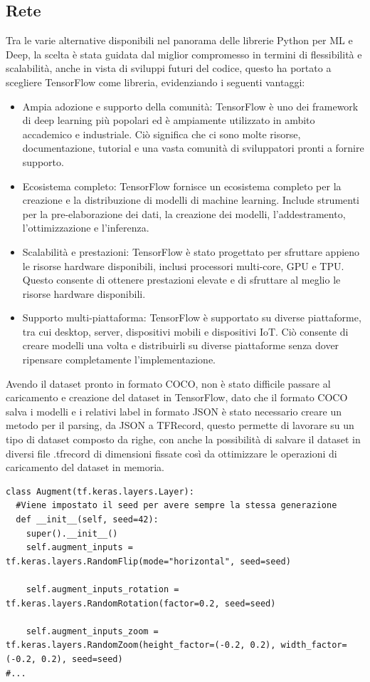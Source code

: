 \documentclass[a4paper,12pt]{report}
\begin{document}
      \subsection{Rete}
      Tra le varie alternative disponibili nel panorama delle librerie Python per ML e Deep,
      la scelta è stata guidata dal miglior compromesso in termini di flessibilità e scalabilità,
      anche in vista di sviluppi futuri del codice, questo ha portato a scegliere
      TensorFlow \cite{tensorflow} come libreria, evidenziando i seguenti vantaggi:
      \begin{itemize}
        \item Ampia adozione e supporto della comunità: TensorFlow è uno dei framework di deep learning più popolari ed è ampiamente utilizzato in ambito accademico e industriale. Ciò significa che ci sono molte risorse, documentazione, tutorial e una vasta comunità di sviluppatori pronti a fornire supporto.
        \item Ecosistema completo: TensorFlow fornisce un ecosistema completo per la creazione e la distribuzione di modelli di machine learning. Include strumenti per la pre-elaborazione dei dati, la creazione dei modelli, l'addestramento, l'ottimizzazione e l'inferenza.
        \item Scalabilità e prestazioni: TensorFlow è stato progettato per sfruttare appieno le risorse hardware disponibili, inclusi processori multi-core, GPU e TPU. Questo consente di ottenere prestazioni elevate e di sfruttare al meglio le risorse hardware disponibili.
        \item Supporto multi-piattaforma: TensorFlow è supportato su diverse piattaforme, tra cui desktop, server, dispositivi mobili e dispositivi IoT. Ciò consente di creare modelli una volta e distribuirli su diverse piattaforme senza dover ripensare completamente l'implementazione.
      \end{itemize}
      \newpage
      Avendo il dataset pronto in formato COCO, non è stato difficile passare al
      caricamento e creazione del dataset in TensorFlow, 
      dato che il formato COCO salva i modelli e i relativi label
      in formato JSON è stato necessario creare un metodo per il 
      parsing, da JSON a TFRecord, questo permette di lavorare su 
      un tipo di dataset composto da righe, con anche la possibilità
      di salvare il dataset in diversi file .tfrecord di dimensioni fissate
      così da ottimizzare le operazioni di caricamento del dataset in memoria. 
      \begin{lstlisting}
class Augment(tf.keras.layers.Layer):
  #Viene impostato il seed per avere sempre la stessa generazione
  def __init__(self, seed=42):
    super().__init__()
    self.augment_inputs = tf.keras.layers.RandomFlip(mode="horizontal", seed=seed)
    
    self.augment_inputs_rotation = tf.keras.layers.RandomRotation(factor=0.2, seed=seed)
    
    self.augment_inputs_zoom = tf.keras.layers.RandomZoom(height_factor=(-0.2, 0.2), width_factor=(-0.2, 0.2), seed=seed)
#...
      \end{lstlisting}
 
\end{document}
